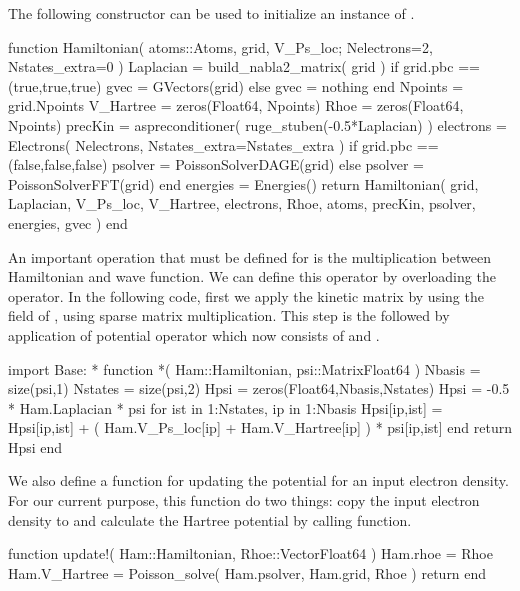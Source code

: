The following constructor can be used to initialize an instance of .

\begin{juliacode}
function Hamiltonian(
  atoms::Atoms, grid, V_Ps_loc;
  Nelectrons=2, Nstates_extra=0
)
  Laplacian = build_nabla2_matrix( grid )
  if grid.pbc == (true,true,true)
      gvec = GVectors(grid)
  else
      gvec = nothing
  end
  Npoints = grid.Npoints
  V_Hartree = zeros(Float64, Npoints)
  Rhoe = zeros(Float64, Npoints)
  precKin = aspreconditioner( ruge_stuben(-0.5*Laplacian) )
  electrons = Electrons( Nelectrons, Nstates_extra=Nstates_extra )
  if grid.pbc == (false,false,false)
      psolver = PoissonSolverDAGE(grid)
  else
      psolver = PoissonSolverFFT(grid)
  end
  energies = Energies()
  return Hamiltonian( grid, Laplacian, V_Ps_loc, V_Hartree, electrons,
                      Rhoe, atoms, precKin, psolver, energies, gvec )
end
\end{juliacode}

An important operation that must be defined for  is the
multiplication between Hamiltonian and wave function.
We can define this operator by overloading the \jlinline{*} operator.
In the following code, first we apply the kinetic matrix by using the
 field of , using sparse matrix
multiplication. This step is the followed by application of potential operator
which now consists of  and .
\begin{juliacode}
import Base: *
function *( Ham::Hamiltonian, psi::Matrix{Float64} )
  Nbasis = size(psi,1)
  Nstates = size(psi,2)
  Hpsi = zeros(Float64,Nbasis,Nstates)
  Hpsi = -0.5 * Ham.Laplacian * psi
  for ist in 1:Nstates, ip in 1:Nbasis
    Hpsi[ip,ist] = Hpsi[ip,ist] + ( Ham.V_Ps_loc[ip] + Ham.V_Hartree[ip] ) * psi[ip,ist]
  end
  return Hpsi
end
\end{juliacode}


We also define a function for updating the potential for an input electron density.
For our current purpose, this function do two things:
copy the input electron density to  and calculate the
Hartree potential by calling  function.

\begin{juliacode}
function update!( Ham::Hamiltonian, Rhoe::Vector{Float64} )
  Ham.rhoe = Rhoe
  Ham.V_Hartree = Poisson_solve( Ham.psolver, Ham.grid, Rhoe )
  return
end
\end{juliacode}


